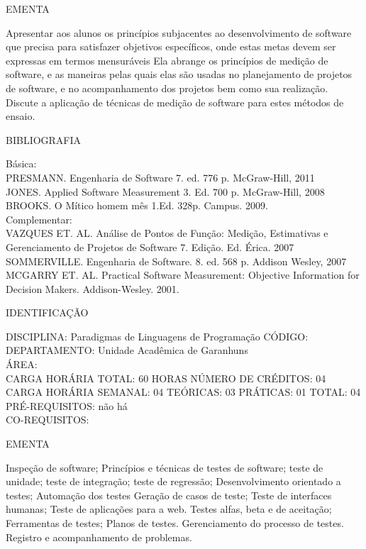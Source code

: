 \documentclass[
	12pt,				%
	openright,			%
  oneside,     %
	a4paper,			%
	chapter=TITLE,		%
	english,			%
	french,				%
	spanish,			%
	brazil				%
	]{abntex2}
\begin{document}
\begin{apendicesenv}
EMENTA 

Apresentar aos alunos os princípios subjacentes ao desenvolvimento de software que precisa para satisfazer objetivos específicos, onde estas metas devem ser expressas em termos mensuráveis Ela abrange os princípios de medição de software, e as maneiras pelas quais elas são usadas no planejamento de projetos de software, e no acompanhamento dos projetos bem como sua realização. Discute a aplicação de técnicas de medição de software para estes métodos de ensaio.

BIBLIOGRAFIA 

Básica:\\
PRESMANN. Engenharia de Software 7. ed. 776 p. McGraw-Hill, 2011\\
JONES. Applied Software Measurement 3. Ed. 700 p. McGraw-Hill, 2008\\
BROOKS. O Mítico homem mês 1.Ed. 328p. Campus. 2009.\\
Complementar:\\
VAZQUES ET. AL. Análise de Pontos de Função: Medição, Estimativas e
Gerenciamento de Projetos de Software  7. Edição. Ed. Érica. 2007\\
SOMMERVILLE. Engenharia de Software. 8. ed. 568 p. Addison Wesley, 2007\\
MCGARRY ET. AL. Practical Software Measurement: Objective Information
for Decision Makers. Addison-Wesley. 2001.

\newpage IDENTIFICAÇÃO

DISCIPLINA: Paradigmas de Linguagens de Programação CÓDIGO:\\ 
DEPARTAMENTO: Unidade Acadêmica de Garanhuns\\
ÁREA: \\
CARGA HORÁRIA TOTAL: 60 HORAS NÚMERO DE CRÉDITOS: 04\\
CARGA HORÁRIA SEMANAL: 04 TEÓRICAS: 03 PRÁTICAS: 01 TOTAL: 04 \\
PRÉ-REQUISITOS: não há\\
CO-REQUISITOS: 

EMENTA 

Inspeção de software; Princípios e técnicas de testes de software; teste
de unidade; teste de integração; teste de regressão; Desenvolvimento
orientado a testes; Automação dos testes
Geração de casos de teste; Teste de interfaces humanas; Teste de
aplicações para a web. 
Testes alfas, beta e de aceitação; Ferramentas de testes; Planos de
testes. Gerenciamento do processo de testes. Registro e acompanhamento
de problemas.


\end{apendicesenv}
\end{document}
